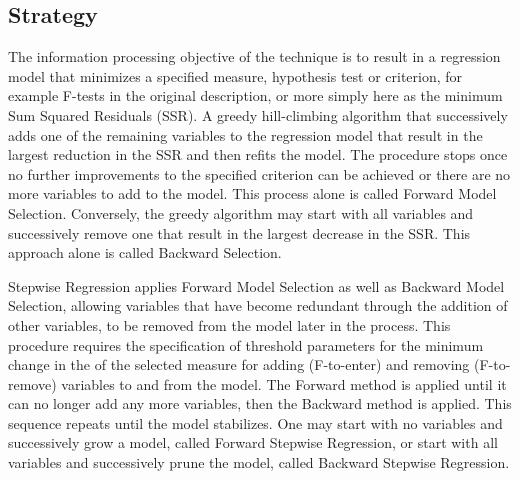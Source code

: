\subsection{Strategy}
The information processing objective of the technique is to result in a regression model that minimizes a specified measure, hypothesis test or criterion, for example F-tests in the original description, or more simply here as the minimum Sum Squared Residuals (SSR).
A greedy hill-climbing algorithm that successively adds one of the remaining variables to the regression model that result in the largest reduction in the SSR and then refits the model. The procedure stops once no further improvements to the specified criterion can be achieved or there are no more variables to add to the model. This process alone is called Forward Model Selection. Conversely, the greedy algorithm may start with all variables and successively remove one that result in the largest decrease in the SSR. This approach alone is called Backward Selection.

Stepwise Regression applies Forward Model Selection as well as Backward Model Selection, allowing variables that have become redundant through the addition of other variables, to be removed from the model later in the process. This procedure requires the specification of threshold parameters for the minimum change in the of the selected measure for adding (F-to-enter) and removing (F-to-remove) variables to and from the model. The Forward method is applied until it can no longer add any more variables, then the Backward method is applied. This sequence repeats until the model stabilizes. One may start with no variables and successively grow a model, called Forward Stepwise Regression, or start with all variables and successively prune the model, called Backward Stepwise Regression.

